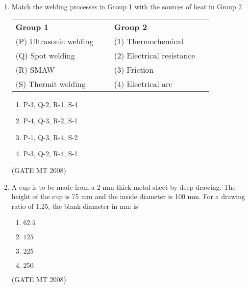 \documentclass[11pt, letterpaper]{article}
\theoremstyle{remark}
\begin{document}
\begin{enumerate}[label=Q.\arabic*]
    \begin{multicols}{2}
        \begin{enumerate}[label=(\MakeUppercase{\alph*})]
            \item R $\rightarrow$ Q $\rightarrow$ P
            \item P $\rightarrow$ Q $\rightarrow$ R
            \item Q $\rightarrow$ P $\rightarrow$ R
            \item Q $\rightarrow$ R $\rightarrow$ P
        \end{enumerate}
    \end{multicols}
\hfill(GATE MT 2008)
    \item Match the welding processes in Group 1 with the sources of heat in Group 2

    \begin{tabular}{p{0.45\linewidth} p{0.45\linewidth}}
        \textbf{Group 1} & \textbf{Group 2} \\
        (P) Ultrasonic welding & (1) Thermochemical \\
        (Q) Spot welding & (2) Electrical resistance \\
        (R) SMAW & (3) Friction \\
        (S) Thermit welding & (4) Electrical arc
    \end{tabular}

    \begin{multicols}{2}
        \begin{enumerate}[label=(\MakeUppercase{\alph*})]
            \item P-3, Q-2, R-1, S-4
            \item P-4, Q-3, R-2, S-1
            \item P-1, Q-3, R-4, S-2
            \item P-3, Q-2, R-4, S-1
        \end{enumerate}
    \end{multicols}
\hfill(GATE MT 2008)
    \item A cup is to be made from a 2 mm thick metal sheet by deep-drawing. 
    The height of the cup is 75 mm and the inside diameter is 100 mm. 
    For a drawing ratio of 1.25, the blank diameter in mm is
    \begin{multicols}{4}
        \begin{enumerate}[label=(\MakeUppercase{\alph*})]
            \item $62.5$
            \item $125$
            \item $225$
            \item $250$
        \end{enumerate}
    \end{multicols}
\hfill(GATE MT 2008)


\end{enumerate}
\end{document}
